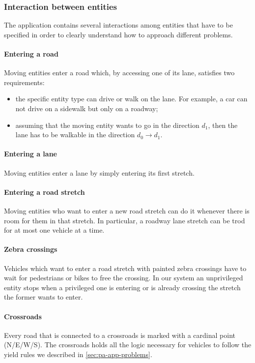 \subsubsection{Interaction between entities}

The application contains several interactions among entities that have to be
specified in order to clearly understand how to approach different problems.

\paragraph{Entering a road} Moving entities enter a road which, by accessing
one of its lane, satisfies two requirements:

\begin{itemize}
  \item the specific entity type can drive or walk on the lane. For example,
  a car can not drive on a sidewalk but only on a roadway;
  \item assuming that the moving entity wants to go in the direction $d_1$,
    then the lane has to be walkable in the direction $d_0 \rightarrow d_1$.
\end{itemize}

\paragraph{Entering a lane}
Moving entities enter a lane by simply entering its first stretch.

\paragraph{Entering a road stretch}
Moving entities who want to enter a new road stretch can do it whenever there
is room for them in that stretch.
In particular, a roadway lane stretch can be trod for at most one vehicle at a
time.

\paragraph{Zebra crossings}
Vehicles which want to enter a road stretch with painted zebra crossings have
to wait for pedestrians or bikes to free the crossing.
In our system an unprivileged entity stops when a privileged one is entering 
or is already crossing the stretch the former wants to enter.

\paragraph{Crossroads} Every road that is connected to a crossroads is marked
with a cardinal point (N/E/W/S). The crossroads holds all the logic necessary
for vehicles to follow the yield rules we described in
\ref{sec:pa-app-problems}.

